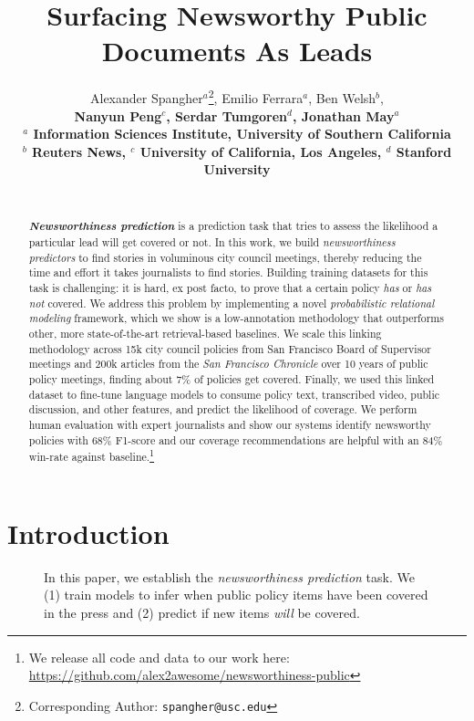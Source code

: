\documentclass[11pt]{article}
\title{Surfacing Newsworthy Public Documents As Leads}
\author{Alexander Spangher$^a$\thanks{Corresponding Author: \texttt{spangher@usc.edu}}, Emilio Ferrara$^a$, Ben Welsh$^b$, \\ \bf Nanyun Peng$^c$, Serdar Tumgoren$^d$, Jonathan May$^a$ \\
  $^a$ Information Sciences Institute, University of Southern California \\
  $^b$ Reuters News, $^c$ University of California, Los Angeles, $^d$ Stanford University \\
  \\}
\begin{document}
\maketitle
\begin{abstract}

\textbf{\textit{Newsworthiness prediction}} is a prediction task that tries to assess the likelihood a particular lead will get covered or not. In this work, we build \textit{newsworthiness predictors} to find stories in voluminous city council meetings, thereby reducing the time and effort it takes journalists to find stories. 
%
Building training datasets for this task is challenging: it is hard, ex post facto, to prove that a certain policy \textit{has} or \textit{has not} covered. We address this problem by implementing a novel \textit{probabilistic relational modeling} framework, which we show is a low-annotation methodology that outperforms other, more state-of-the-art retrieval-based baselines. 
%
We scale this linking methodology across 15k city council policies from San Francisco Board of Supervisor meetings and 200k articles from the \textit{San Francisco Chronicle} over 10 years of public policy meetings, finding about 7\% of policies get covered. 
%
Finally, we used this linked dataset to fine-tune language models to consume policy text, transcribed video, public discussion, and other features, and predict the likelihood of coverage. We perform human evaluation with expert journalists and show our systems identify newsworthy policies with 68\% F1-score and our coverage recommendations are helpful with an 84\% win-rate against baseline.\footnote{We release all code and data to our work here: \url{https://github.com/alex2awesome/newsworthiness-public}} 


\end{abstract}

\vspace{.3cm}
\section{Introduction}

\begin{figure}

\caption{In this paper, we establish the \textit{newsworthiness prediction} task. We (1) train models to infer when public policy items have been covered in the press and (2)  predict if new items \textit{will} be covered. }
\label{fig:example}
\end{figure}
\end{document}
